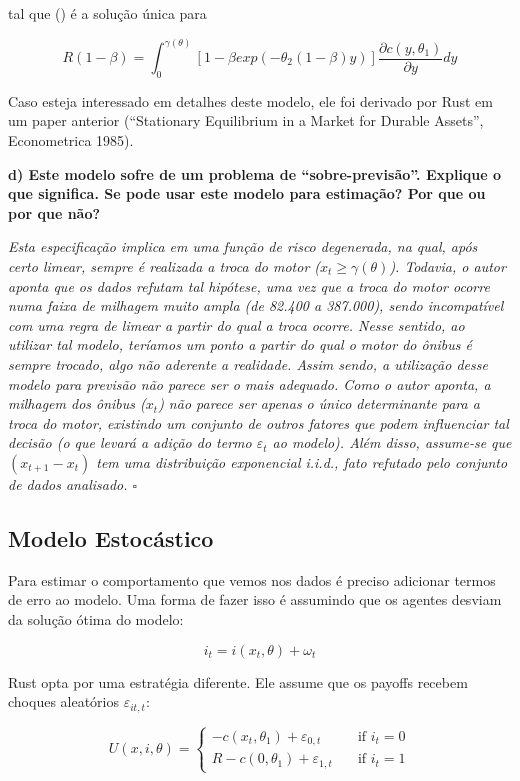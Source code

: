 \documentclass[12pt,a4paper]{article}
\begin{document}
tal que \gamma(\theta) é a solução única para

\[R(1-\beta) = \int_0^{\gamma(\theta)}[1 - \beta exp(-\theta_2(1 - \beta)y)]\frac{\partial c(y,\theta_1)}{\partial y}dy\]

Caso esteja interessado em detalhes deste modelo, ele foi derivado por
Rust em um paper anterior (``Stationary Equilibrium in a Market for
Durable Assets'', Econometrica 1985).

\textbf{d) Este modelo sofre de um problema de ``sobre-previsão''.
Explique o que significa. Se pode usar este modelo para estimação? Por
que ou por que não?}

\emph{Esta especificação implica em uma função de risco degenerada, na
qual, após certo limear, sempre é realizada a troca do motor
(\(x_t \ge \gamma(\theta)\)). Todavia, o autor aponta que os dados
refutam tal hipótese, uma vez que a troca do motor ocorre numa faixa de
milhagem muito ampla (de 82.400 a 387.000), sendo incompatível com uma
regra de limear a partir do qual a troca ocorre. Nesse sentido, ao
utilizar tal modelo, teríamos um ponto a partir do qual o motor do
ônibus é sempre trocado, algo não aderente a realidade. Assim sendo, a
utilização desse modelo para previsão não parece ser o mais adequado.
Como o autor aponta, a milhagem dos ônibus (\(x_t\)) não parece ser
apenas o único determinante para a troca do motor, existindo um conjunto
de outros fatores que podem influenciar tal decisão (o que levará a
adição do termo \(\varepsilon_t\) ao modelo). Além disso, assume-se que
\((x_{t+1}-x_t)\) tem uma distribuição exponencial i.i.d., fato refutado
pelo conjunto de dados analisado. \(\square\)}

\hypertarget{modelo-estocastico}{%
\subsection{Modelo Estocástico}\label{modelo-estocastico}}

Para estimar o comportamento que vemos nos dados é preciso adicionar
termos de erro ao modelo. Uma forma de fazer isso é assumindo que os
agentes desviam da solução ótima do modelo:

\[i_t = i(x_t, \theta) + \omega_t\]

Rust opta por uma estratégia diferente. Ele assume que os payoffs
recebem choques aleatórios \(\varepsilon_{it,t}\):

\[ U(x,i,\theta) = 
  \begin{cases}
    -c(x_t,\theta_1) + \varepsilon_{0,t}    & \quad \text{if } i_t=0\\
    R - c(0,\theta_1) + \varepsilon_{1,t}  & \quad \text{if } i_t=1
  \end{cases}
\]
\end{document}
